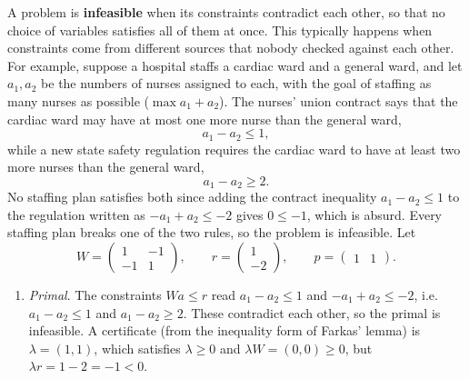 	\begin{example}
	  \label{ex:both-infeasible}
		A problem is \textbf{infeasible} when its constraints contradict each other, so that no choice of variables satisfies all of them at once. This typically happens when constraints come from different sources that nobody checked against each other. For example, suppose a hospital staffs a cardiac ward and a general ward, and let $a_1, a_2$ be the numbers of nurses assigned to each, with the goal of staffing as many nurses as possible ($\max a_1 + a_2$). The nurses' union contract says that the cardiac ward may have at most one more nurse than the general ward, 
		\begin{equation}
			a_1 - a_2 \leq 1,
		\end{equation}
		while a new state safety regulation requires the cardiac ward to have at least two more nurses than the general ward, 
		\begin{equation}
			a_1 - a_2 \geq 2.
		\end{equation}
		No staffing plan satisfies both since adding the contract inequality $a_1 - a_2 \leq 1$ to the regulation written as $-a_1 + a_2 \leq -2$ gives $0 \leq -1$, which is absurd. Every staffing plan breaks one of the two rules, so the problem is infeasible. Let 
		\begin{equation}
			W = \begin{pmatrix} 1 & -1 \\ -1 & 1 \end{pmatrix}, \qquad r = \begin{pmatrix} 1 \\ -2 \end{pmatrix}, \qquad p = \begin{pmatrix} 1 & 1 \end{pmatrix}.
		\end{equation}
		\begin{enumerate}
			\item \textit{Primal}. The constraints $Wa \leq r$ read $a_1 - a_2 \leq 1$ and $-a_1 + a_2 \leq -2$, i.e. $a_1 - a_2 \leq 1$ and $a_1 - a_2 \geq 2$. These contradict each other, so the primal is infeasible. A certificate (from the inequality form of Farkas' lemma) is $\lambda = (1, 1)$, which satisfies $\lambda \geq 0$ and $\lambda W = (0, 0) \geq 0$, but $\lambda r = 1 - 2 = -1 < 0$. 


\end{enumerate}
\end{example}
